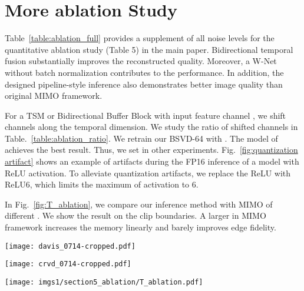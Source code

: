 \documentclass[sigconf]{acmart}
\begin{document}
\section{More ablation Study}



Table~\ref{table:ablation_full} provides a supplement of all noise levels for the quantitative ablation study (Table 5) in the main paper. Bidirectional temporal fusion substantially improves the reconstructed quality. Moreover, a W-Net without batch normalization contributes to the performance. In addition, the designed pipeline-style inference also demonstrates better image quality than original MIMO framework.


For a TSM or Bidirectional Buffer Block with input feature channel , we shift  channels along the temporal dimension. We study the ratio of shifted channels in Table.~\ref{table:ablation_ratio}. We retrain our BSVD-64 with . The model of  achieves the best result. Thus, we set  in other experiments.
Fig.~\ref{fig:quantization artifact} shows an example of artifacts during the FP16 inference of a model with ReLU activation. To alleviate quantization artifacts, we replace the ReLU with ReLU6, which limits the maximum of activation to 6.

In Fig.~\ref{fig:T_ablation}, we compare our inference method with MIMO of different . We show the result on the clip boundaries. A larger  in MIMO framework increases the memory linearly and barely improves edge fidelity.

\begin{figure*}[ht]
\centering
\texttt{[image: davis\_0714-cropped.pdf]}
\caption{Qualitative comparison on DAVIS dataset.}
\label{fig:visual_davis_supp}
\end{figure*}

\begin{figure*}[ht]
\centering
\texttt{[image: crvd\_0714-cropped.pdf]}
\caption{Qualitative comparison on CRVD dataset}
\label{fig:visual_crvd_supp}
\end{figure*}


\begin{figure*}[h]
\centering
\texttt{[image: imgs1/section5\_ablation/T\_ablation.pdf]}
\caption{Comparison with MIMO of different .}
\label{fig:T_ablation}
\end{figure*}
\end{document}
